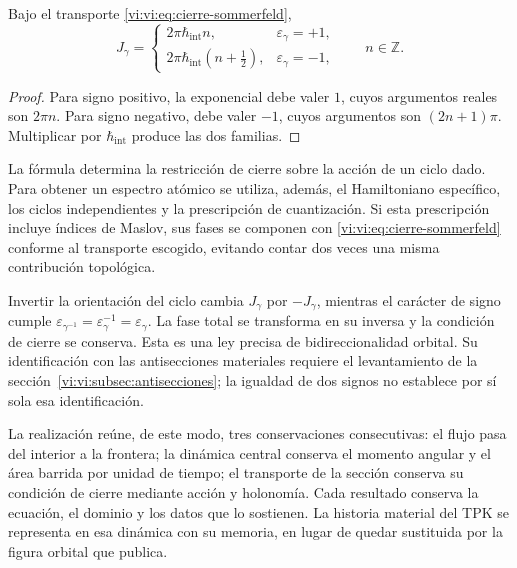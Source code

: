 \begin{theorem}
\label{vi:vi:thm:sommerfeld}
Bajo el transporte \eqref{vi:vi:eq:cierre-sommerfeld},
\begin{equation}
 J_\gamma=
 \begin{cases}
  2\pi\hbar_{\mathrm{int}}n,
          &\varepsilon_\gamma=+1,\\[1mm]
  2\pi\hbar_{\mathrm{int}}(n+\tfrac12),
          &\varepsilon_\gamma=-1,
 \end{cases}
 \qquad n\in\mathbb Z.
 \label{vi:vi:eq:accion-sommerfeld}
\end{equation}
\end{theorem}
\begin{proof}
Para signo positivo, la exponencial debe valer $1$, cuyos
argumentos reales son $2\pi n$. Para signo negativo, debe
valer $-1$, cuyos argumentos son $(2n+1)\pi$. Multiplicar
por $\hbar_{\mathrm{int}}$ produce las dos familias.
\end{proof}

La fórmula determina la restricción de cierre sobre la
acción de un ciclo dado. Para obtener un espectro atómico
se utiliza, además, el Hamiltoniano específico, los ciclos
independientes y la prescripción de cuantización. Si esta
prescripción incluye índices de Maslov, sus fases se
componen con \eqref{vi:vi:eq:cierre-sommerfeld} conforme al
transporte escogido, evitando contar dos veces una misma
contribución topológica.

Invertir la orientación del ciclo cambia $J_\gamma$ por
$-J_\gamma$, mientras el carácter de signo cumple
$\varepsilon_{\gamma^{-1}}=\varepsilon_\gamma^{-1}
=\varepsilon_\gamma$. La fase total se transforma en su
inversa y la condición de cierre se conserva. Esta es una
ley precisa de bidireccionalidad orbital. Su identificación
con las antisecciones materiales requiere el levantamiento
de la sección~\ref{vi:vi:subsec:antisecciones}; la igualdad
de dos signos no establece por sí sola esa identificación.

La realización reúne, de este modo, tres conservaciones
consecutivas: el flujo pasa del interior a la frontera;
la dinámica central conserva el momento angular y el área
barrida por unidad de tiempo; el transporte de la sección
conserva su condición de cierre mediante acción y
holonomía. Cada resultado conserva la ecuación, el dominio
y los datos que lo sostienen. La historia material del
TPK se representa en esa dinámica con su memoria, en lugar
de quedar sustituida por la figura orbital que publica.
